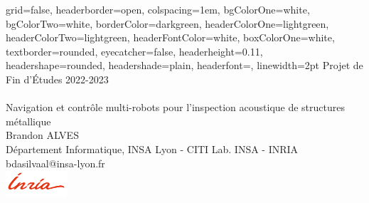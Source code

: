 \documentclass[a0paper,portrait]{baposter}
\begin{document}
	\begin{poster}
		{
			grid=false,
			headerborder=open, %
			colspacing=1em, %
			bgColorOne=white, %
			bgColorTwo=white, %
			borderColor=darkgreen, %
			headerColorOne=lightgreen, %
			headerColorTwo=lightgreen, %
			headerFontColor=white, %
			boxColorOne=white, %
			textborder=rounded, %
			eyecatcher=false, %
			headerheight=0.11\textheight, %
			headershape=rounded, %
			headershade=plain,
			headerfont=\Large\textsf, %
			linewidth=2pt %
		}
		{}
		{
			{\small Projet de Fin d'Études 2022-2023}
			\sf\vspace{0.3em}\\
			\\\textsf
			{Navigation et contrôle multi-robots pour l'inspection acoustique de structures métallique}
		}
		{
			\sf\vspace{0.5em}\\
			Brandon ALVES
			\vspace{0.1em}\\
			\small{
				Département Informatique, INSA Lyon - CITI Lab. INSA - INRIA
				\vspace{0.2em}\\
				bdasilvaal@insa-lyon.fr
				\vspace{0.2em}\\
			}
		}
		{
			\hspace{0.5cm}
			\includegraphics[height=1cm]{graphics/LogoStructureAccueil.png}
}
\end{poster}
\end{document}
